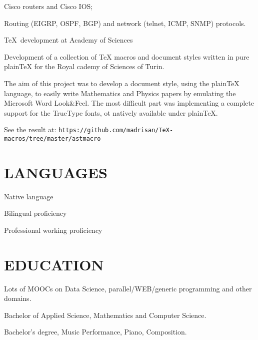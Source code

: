 \item{\bdot} Cisco routers and Cisco IOS;
\item{\bdot} Routing (EIGRP, OSPF, BGP) and network (telnet, ICMP, SNMP)
             protocols.
   

\bigskip
{}
   {\TeX\ development at Academy of Sciences}

\noindent
Development of a collection of TeX macros and document styles written in pure plainTeX
for the Royal cademy of Sciences of Turin.

The aim of this project was to develop a document style, using the plainTeX language, 
to easily write Mathematics and Physics papers by emulating the Microsoft Word 
Look\&Feel.
The most difficult part was implementing a complete support for the TrueType fonts,
ot natively available under plain\TeX.

See the result at:
\hfill\break\noindent
{\tt https:/\negthinspace/github.com/madrisan/TeX-macros/tree/master/astmacro}


\section{LANGUAGES}

Native language

Bilingual proficiency

Professional working proficiency


\section{EDUCATION}

Lots of MOOCs on Data Science, parallel/WEB/generic programming and other domains.
\bigskip

\noindent
Bachelor of Applied Science, Mathematics and Computer Science.
\bigskip

\noindent
Bachelor's degree, Music Performance, Piano, Composition.

